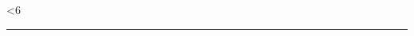 \documentclass{article}
\newcounter{ctr}
\newcounter{ctra}
\newlength\rwidth
\begin{document}
\begin{center}
\loop
\ifnum\thectr<6
\fbox{\thectra}\colorbox{gray}{\color{olive}\rule{\the\rwidth}{30pt} }\\[-1.0pt]
\addtocounter{ctra}{7}
  \setlength\rwidth{\dimexpr\the\rwidth+30pt\relax}
\repeat
\end{center}
\end{document}
